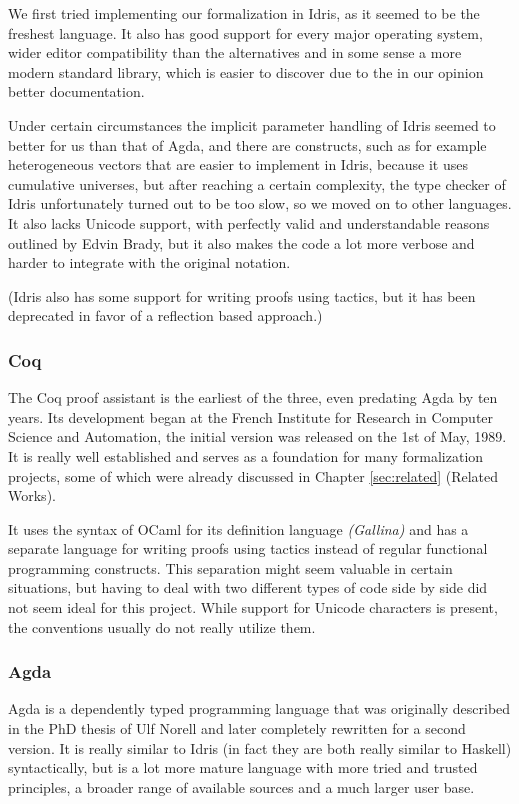 We first tried implementing our formalization in Idris, as it seemed to be the freshest language. It also has good support for every major operating system, wider editor compatibility than the alternatives and in some sense a more modern standard library, which is easier to discover due to the in our opinion better documentation.

Under certain circumstances the implicit parameter handling of Idris seemed to better for us than that of Agda, and there are constructs, such as for example heterogeneous vectors that are easier to implement in Idris, because it uses cumulative universes, but after reaching a certain complexity, the type checker of Idris unfortunately turned out to be too slow, so we moved on to other languages. It also lacks Unicode support, with perfectly valid and understandable reasons outlined by Edvin Brady, but it also makes the code a lot more verbose and harder to integrate with the original notation.

(Idris also has some support for writing proofs using tactics, but it has been deprecated in favor of a reflection based approach.)

\subsubsection{Coq}
The Coq proof assistant\cite{the_coq_development_team_2020_3744225}\cite{Coq} is the earliest of the three, even predating Agda by ten years. Its development began at the French Institute for Research in Computer Science and Automation, the initial version was released on the 1st of May, 1989. It is really well established and serves as a foundation for many formalization projects, some of which were already discussed in Chapter \ref{sec:related} (Related Works). 

It uses the syntax of OCaml for its definition language \textit{(Gallina)} and has a separate language for writing proofs using tactics instead of regular functional programming constructs. This separation might seem valuable in certain situations, but having to deal with two different types of code side by side did not seem ideal for this project. While support for Unicode characters is present, the conventions usually do not really utilize them.

\subsubsection{Agda}
Agda\cite{agda} is a dependently typed programming language that was originally described in the PhD thesis of Ulf Norell\cite{norell:thesis} and later completely rewritten for a second version. It is really similar to Idris (in fact they are both really similar to Haskell) syntactically, but is a lot more mature language with more tried and trusted principles, a broader range of available sources and a much larger user base.

